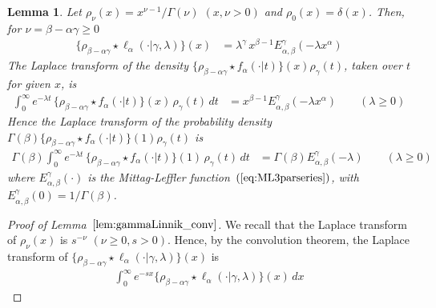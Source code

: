 \documentclass[a4paper,12pt]{article}
\newtheorem{lemma}{Lemma}
\begin{document}
{{%
\begin{lemma}
\label{lem:gammaLinnik_conv}
Let  $\rho_\nu(x)=x^{\nu-1}/\Gamma(\nu)$ $(x,\nu>0)$ and $\rho_0(x)=\delta(x)$.
Then, for $\nu=\beta-\alpha\gamma\ge0$ 
 \begin{align}
\{\rho_{\beta-\alpha\gamma} \star \ell_\alpha(\cdot \vert \gamma, \lambda)\}(x) 
&=  \lambda^{\gamma} \, x^{\beta-1}E^\gamma_{\alpha,\beta}(-\lambda x^\alpha)
\label{eq:gammaLinnik_conv} 
\end{align}
The Laplace transform of the  density  
$\{\rho_{\beta-\alpha\gamma} \star f_\alpha(\cdot\vert  t)\}(x)\rho_\gamma(t)$, taken over $t$ for given $x$, is
\begin{align}
\int_0^\infty e^{-\lambda t} \, \{\rho_{\beta-\alpha\gamma} \star f_\alpha(\cdot\vert  t)\}(x) \, \rho_\gamma(t) \, dt 
&= x^{\beta-1}E^\gamma_{\alpha,\beta}(-\lambda x^\alpha)  \qquad (\lambda\ge0)
\label{eq:gammaLinnik_conv_LT_x}
 \end{align}
Hence the  Laplace transform of the probability density  $\Gamma(\beta)\{\rho_{\beta-\alpha\gamma} \star f_\alpha(\cdot\vert  t)\}(1)\rho_\gamma(t)$ is 
\begin{align}
\Gamma(\beta) \int_0^\infty e^{-\lambda t} \, \{\rho_{\beta-\alpha\gamma} \star f_\alpha(\cdot\vert  t)\}(1) \, \rho_\gamma(t) \, dt 
&= \Gamma(\beta)E^\gamma_{\alpha,\beta}(-\lambda)  \qquad (\lambda\ge0)
\label{eq:gammaLinnik_conv_LT}
 \end{align}
where $E^\gamma_{\alpha,\beta}(\cdot)$ is the Mittag-Leffler function~$(\ref{eq:ML3parseries})$, with $E^\gamma_{\alpha,\beta}(0)=1/\Gamma(\beta)$.
\end{lemma}
\begin{proof} [Proof of Lemma~$\ref{lem:gammaLinnik_conv}$]
\label{proof:gammaLinnik_conv}
We recall that the Laplace transform of $\rho_\nu(x)$ is $s^{-\nu}$ $(\nu\ge0, s>0)$.
Hence, by the convolution theorem, the Laplace transform of $\{\rho_{\beta-\alpha\gamma}\star \ell_\alpha(\cdot \vert \gamma, \lambda)\}(x)$ is
 \begin{align*}
 \int_0^\infty e^{-s x}  \{\rho_{\beta-\alpha\gamma}\star \ell_\alpha(\cdot \vert \gamma, \lambda)\}(x)\, dx

\end{align*}
\end{proof}}}
\end{document}
